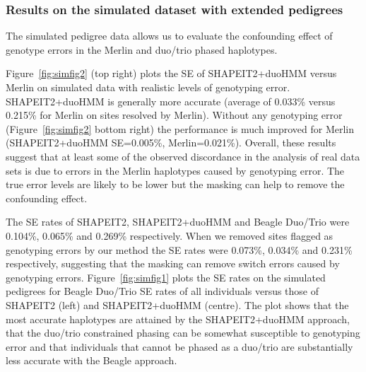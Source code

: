 \subsubsection{Results on the simulated dataset with extended pedigrees}

The simulated pedigree data allows us to evaluate the confounding effect of genotype errors in the Merlin and duo/trio phased haplotypes.

Figure~\ref{fig:simfig2} (top right) plots the SE of SHAPEIT2+duoHMM versus Merlin on simulated data with realistic levels of genotyping error. SHAPEIT2+duoHMM is generally more accurate (average of 0.033\% versus 0.215\% for Merlin on sites resolved by Merlin). Without any genotyping error (Figure~\ref{fig:simfig2} bottom right) the performance is much improved for Merlin (SHAPEIT2+duoHMM SE=0.005\%, Merlin=0.021\%). Overall, these results suggest that at least some of the observed discordance in the analysis of real data sets is due to errors in the Merlin haplotypes caused by genotyping error. The true error levels are likely to be lower but the masking can help to remove the confounding effect.

The SE rates of SHAPEIT2, SHAPEIT2+duoHMM and Beagle Duo/Trio were 0.104\%, 0.065\% and 0.269\% respectively. When we removed sites flagged as genotyping errors by our method the SE rates were 0.073\%, 0.034\% and 0.231\% respectively, suggesting that the masking can remove switch errors caused by genotyping errors. Figure~\ref{fig:simfig1} plots the SE rates on the simulated pedigrees for Beagle Duo/Trio SE rates of all individuals versus those of SHAPEIT2 (left) and SHAPEIT2+duoHMM (centre). The plot shows that the most accurate haplotypes are attained by the SHAPEIT2+duoHMM approach, that the duo/trio constrained phasing can be somewhat susceptible to genotyping error and that individuals that cannot be phased as a duo/trio are substantially less accurate with the Beagle approach.



